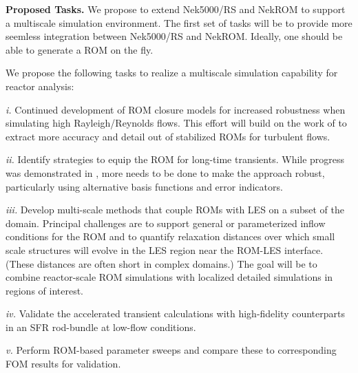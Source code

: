 \noindent
{\bf Proposed Tasks.}
We propose to extend Nek5000/RS and NekROM to support a multiscale simulation
environment.   The first set of tasks will be to provide more seemless integration
between Nek5000/RS and NekROM.  Ideally, one should be able to generate a ROM
on the fly.



We propose the following tasks to realize a multiscale simulation
capability for reactor analysis:
\begin{description}
%
\item{\em i.}
Continued development of ROM closure models for increased robustness when
simulating high Rayleigh/Reynolds flows.  This effort will build on the work of
\cite{kaneko22a,kaneko22,tsai22a} to extract more accuracy and detail out of
stabilized ROMs for turbulent flows.
%
\item{\em ii.}
Identify strategies to equip the ROM for long-time transients.  While progress
was demonstrated in \cite{kaneko20a}, more needs to be done to make the
approach robust, particularly using alternative basis functions and error
indicators.
%
\item{\em iii.}
Develop multi-scale methods that couple ROMs with LES on a subset of
the domain.  Principal challenges are to support general or
parameterized inflow conditions for the ROM and to quantify relaxation
distances over which small scale structures will evolve in the LES region
near the ROM-LES interface.
(These distances are often short in complex domains.)
The goal will be to combine reactor-scale ROM simulations with localized
detailed simulations in regions of interest.
%
\item{\em iv.}
Validate the accelerated transient calculations with high-fidelity counterparts
in an SFR rod-bundle at low-flow conditions.
%
\item{\em v.}
Perform ROM-based parameter sweeps and compare these to corresponding
FOM results for validation.
%
\end{description}




















